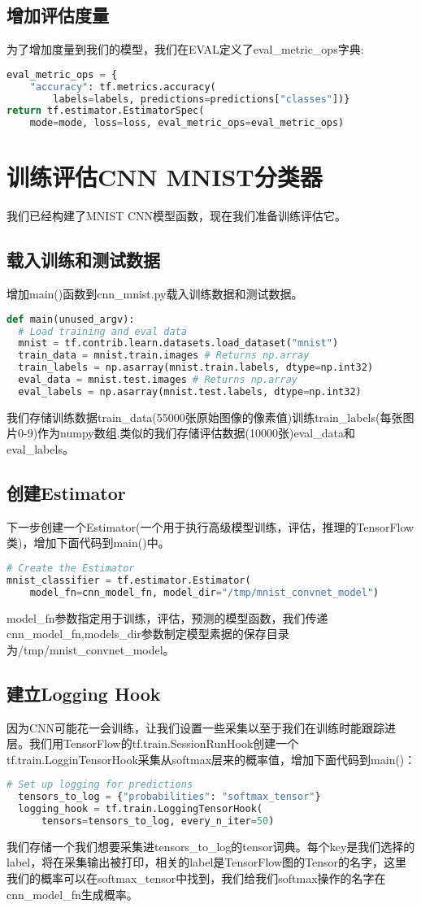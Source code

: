 \subsection{增加评估度量}
为了增加度量到我们的模型，我们在EVAL定义了eval\_metric\_ops字典:
\begin{lstlisting}[language=Python]
eval_metric_ops = {
    "accuracy": tf.metrics.accuracy(
        labels=labels, predictions=predictions["classes"])}
return tf.estimator.EstimatorSpec(
    mode=mode, loss=loss, eval_metric_ops=eval_metric_ops)
\end{lstlisting}
\section{训练评估CNN MNIST分类器}
我们已经构建了MNIST CNN模型函数，现在我们准备训练评估它。
\subsection{载入训练和测试数据}
增加main()函数到cnn\_mnist.py载入训练数据和测试数据。
\begin{lstlisting}[language=Python]
def main(unused_argv):
  # Load training and eval data
  mnist = tf.contrib.learn.datasets.load_dataset("mnist")
  train_data = mnist.train.images # Returns np.array
  train_labels = np.asarray(mnist.train.labels, dtype=np.int32)
  eval_data = mnist.test.images # Returns np.array
  eval_labels = np.asarray(mnist.test.labels, dtype=np.int32)
\end{lstlisting}
我们存储训练数据train\_data(55000张原始图像的像素值)训练train\_labels(每张图片0-9)作为numpy数组.类似的我们存储评估数据(10000张)eval\_data和eval\_labels。
\subsection{创建Estimator}
下一步创建一个Estimator(一个用于执行高级模型训练，评估，推理的TensorFlow类)，增加下面代码到main()中。
\begin{lstlisting}[language=Python]
# Create the Estimator
mnist_classifier = tf.estimator.Estimator(
    model_fn=cnn_model_fn, model_dir="/tmp/mnist_convnet_model")
\end{lstlisting}
model\_fn参数指定用于训练，评估，预测的模型函数，我们传递cnn\_model\_fn,models\_dir参数制定模型素据的保存目录为/tmp/mnist\_convnet\_model。
\subsection{建立Logging Hook}
因为CNN可能花一会训练，让我们设置一些采集以至于我们在训练时能跟踪进层。我们用TensorFlow的tf.train.SessionRunHook创建一个tf.train.LogginTensorHook采集从softmax层来的概率值，增加下面代码到main()：
\begin{lstlisting}[language=Python]
# Set up logging for predictions
  tensors_to_log = {"probabilities": "softmax_tensor"}
  logging_hook = tf.train.LoggingTensorHook(
      tensors=tensors_to_log, every_n_iter=50)
\end{lstlisting}
我们存储一个我们想要采集进tensors\_to\_log的tensor词典。每个key是我们选择的label，将在采集输出被打印，相关的label是TensorFlow图的Tensor的名字，这里我们的概率可以在softmax\_tensor中找到，我们给我们softmax操作的名字在cnn\_model\_fn生成概率。

